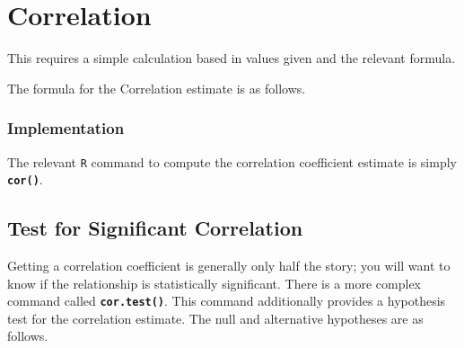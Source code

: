 
\section{Correlation}

This requires a simple calculation based in values given and the relevant formula.

The formula for the Correlation estimate is as follows.




\subsubsection*{Implementation}
The relevant \texttt{R} command to compute the correlation coefficient estimate is simply \texttt{\textbf{cor()}}.

%
%





\subsection*{Test for Significant Correlation}
Getting a correlation coefficient is generally only half the story; you will want to know if the relationship is statistically significant. There is a more complex command called \texttt{\textbf{cor.test()}}. This command additionally provides a hypothesis test for the correlation estimate. The null and alternative hypotheses are as follows.

